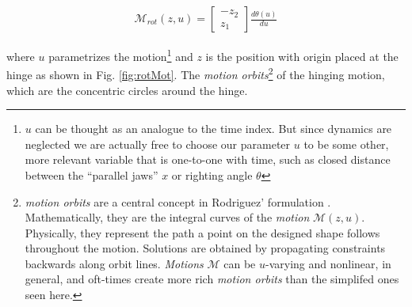 \documentclass[letterpaper]{report}
\begin{document}
\begin{align}
\mathcal{M}_{rot}(z,u) = \begin{bmatrix} -z_2 \\ z_1 \end{bmatrix} \frac{d\theta(u)}{du}
\end{align}

where $u$ parametrizes the motion\footnote{$u$ can be thought as an analogue to the time index. But since dynamics are neglected we are actually free to choose our parameter $u$ to be some other, more relevant variable that is one-to-one with time, such as closed distance between the ``parallel jaws'' $x$ or righting angle $\theta$}
 and $z$ is the position with origin placed at the hinge as shown in Fig. \ref{fig:rotMot}.
The \textit{motion orbits}\footnote{\textit{motion orbits} are a central concept in Rodriguez' formulation \cite{rodriguez2013effector}. Mathematically, they are the integral curves of the \textit{motion} $\mathcal{M}(z,u)$. Physically, they represent the path a point on the designed shape follows throughout the motion. Solutions are obtained by propagating constraints backwards along orbit lines. \textit{Motions} $\mathcal{M}$ can be $u$-varying and nonlinear, in general, and oft-times create more rich \textit{motion orbits} than the simplifed ones seen here.}
 of the hinging motion, which are the concentric circles around the hinge.
\end{document}
